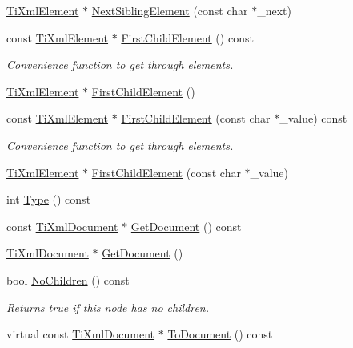 \begin{DoxyCompactItemize}
\item 
\hyperlink{class_ti_xml_element}{Ti\+Xml\+Element} $\ast$ \hyperlink{class_ti_xml_node_a6e1ac6b800e18049bc75e9f8e63a8e5f}{Next\+Sibling\+Element} (const char $\ast$\+\_\+next)
\item 
const \hyperlink{class_ti_xml_element}{Ti\+Xml\+Element} $\ast$ \hyperlink{class_ti_xml_node_ab1f8d8e70d88aea4c5efedfe00862d55}{First\+Child\+Element} () const 
\begin{DoxyCompactList}\small\item\em Convenience function to get through elements. \end{DoxyCompactList}\item 
\hyperlink{class_ti_xml_element}{Ti\+Xml\+Element} $\ast$ \hyperlink{class_ti_xml_node_aa0fecff1f3866ab33a8a25506e95db1d}{First\+Child\+Element} ()
\item 
const \hyperlink{class_ti_xml_element}{Ti\+Xml\+Element} $\ast$ \hyperlink{class_ti_xml_node_a0ec361bfef1cf1978d060295f597e0d9}{First\+Child\+Element} (const char $\ast$\+\_\+value) const 
\begin{DoxyCompactList}\small\item\em Convenience function to get through elements. \end{DoxyCompactList}\item 
\hyperlink{class_ti_xml_element}{Ti\+Xml\+Element} $\ast$ \hyperlink{class_ti_xml_node_a6936ae323675071808ac4840379e57f5}{First\+Child\+Element} (const char $\ast$\+\_\+value)
\item 
int \hyperlink{class_ti_xml_node_a57b99d5c97d67a42b9752f5210a1ba5e}{Type} () const 
\item 
const \hyperlink{class_ti_xml_document}{Ti\+Xml\+Document} $\ast$ \hyperlink{class_ti_xml_node_aa66f4ebcd175204a168ed7c2d7b43071}{Get\+Document} () const 
\item 
\hyperlink{class_ti_xml_document}{Ti\+Xml\+Document} $\ast$ \hyperlink{class_ti_xml_node_a7b2372c0e7adfb32f5b6902fe49a39b2}{Get\+Document} ()
\item 
bool \hyperlink{class_ti_xml_node_aeed21ad30630ef6e7faf096127edc9f3}{No\+Children} () const 
\begin{DoxyCompactList}\small\item\em Returns true if this node has no children. \end{DoxyCompactList}\item 
virtual const \hyperlink{class_ti_xml_document}{Ti\+Xml\+Document} $\ast$ \hyperlink{class_ti_xml_node_a8a4cda4b15c29f64cff419309aebed08}{To\+Document} () const 

\end{DoxyCompactItemize}
